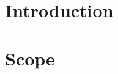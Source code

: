 \documentclass[11pt]{article}
\begin{document}
% 
%
%


\thispagestyle{empty}
\tableofcontents
\vspace{2cm}

\thispagestyle{empty}
\listoffigures
\pagebreak

\section{Introduction}

\section{Scope}
\end{document}
